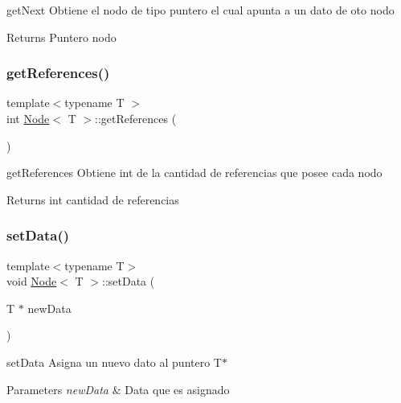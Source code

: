 get\+Next Obtiene el nodo de tipo puntero el cual apunta a un dato de oto nodo 

\begin{DoxyReturn}{Returns}
Puntero nodo 
\end{DoxyReturn}
\mbox{\label{class_node_abc00227ad0e2f9aed2d28e63889c8ad1}} 
\subsubsection{\texorpdfstring{get\+References()}{getReferences()}}
{\footnotesize\ttfamily template$<$typename T $>$ \\
int \hyperlink{class_node}{Node}$<$ T $>$\+::get\+References (\begin{DoxyParamCaption}{ }\end{DoxyParamCaption})}



get\+References Obtiene int de la cantidad de referencias que posee cada nodo 

\begin{DoxyReturn}{Returns}
int cantidad de referencias 
\end{DoxyReturn}
\mbox{\label{class_node_aa2e4b0f1ecd50a82f1271b40ffce9ffa}} 
\subsubsection{\texorpdfstring{set\+Data()}{setData()}}
{\footnotesize\ttfamily template$<$typename T$>$ \\
void \hyperlink{class_node}{Node}$<$ T $>$\+::set\+Data (\begin{DoxyParamCaption}\item[{T $\ast$}]{new\+Data }\end{DoxyParamCaption})}



set\+Data Asigna un nuevo dato al puntero T$\ast$ 


\begin{DoxyParams}{Parameters}
{\em new\+Data} & Data que es asignado \\
\hline
\end{DoxyParams}
\mbox{\label{class_node_a1390ad2bd0dc9cf71b519ee159a7e8ca}} 
